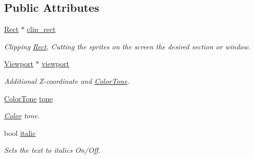\subsection*{Public Attributes}
\begin{DoxyCompactItemize}
\item 
\hypertarget{class_f2_c_1_1_font_sprite_a23c2acdd3cc212d56fcc9021744211d3}{
\hyperlink{class_f2_c_1_1_rect}{Rect} $\ast$ \hyperlink{class_f2_c_1_1_font_sprite_a23c2acdd3cc212d56fcc9021744211d3}{clip\_\-rect}}
\label{class_f2_c_1_1_font_sprite_a23c2acdd3cc212d56fcc9021744211d3}

\begin{DoxyCompactList}\small\item\em Clipping \hyperlink{class_f2_c_1_1_rect}{Rect}, Cutting the sprites on the screen the desired section or window. \item\end{DoxyCompactList}\item 
\hypertarget{class_f2_c_1_1_font_sprite_a4f82be1613af7c8b83e5551ca6c81ed1}{
\hyperlink{class_f2_c_1_1_viewport}{Viewport} $\ast$ \hyperlink{class_f2_c_1_1_font_sprite_a4f82be1613af7c8b83e5551ca6c81ed1}{viewport}}
\label{class_f2_c_1_1_font_sprite_a4f82be1613af7c8b83e5551ca6c81ed1}

\begin{DoxyCompactList}\small\item\em Additional Z-\/coordinate and \hyperlink{class_f2_c_1_1_color_tone}{ColorTone}. \item\end{DoxyCompactList}\item 
\hypertarget{class_f2_c_1_1_font_sprite_aefcc932827b98589b3ed922c1f01e678}{
\hyperlink{class_f2_c_1_1_color_tone}{ColorTone} \hyperlink{class_f2_c_1_1_font_sprite_aefcc932827b98589b3ed922c1f01e678}{tone}}
\label{class_f2_c_1_1_font_sprite_aefcc932827b98589b3ed922c1f01e678}

\begin{DoxyCompactList}\small\item\em \hyperlink{class_f2_c_1_1_color}{Color} tone. \item\end{DoxyCompactList}\item 
\hypertarget{class_f2_c_1_1_font_sprite_abf113caad3e684ea5ed58b6c1557147a}{
bool \hyperlink{class_f2_c_1_1_font_sprite_abf113caad3e684ea5ed58b6c1557147a}{italic}}
\label{class_f2_c_1_1_font_sprite_abf113caad3e684ea5ed58b6c1557147a}

\begin{DoxyCompactList}\small\item\em Sets the text to italics On/Off. \item\end{DoxyCompactList}\end{DoxyCompactItemize}
